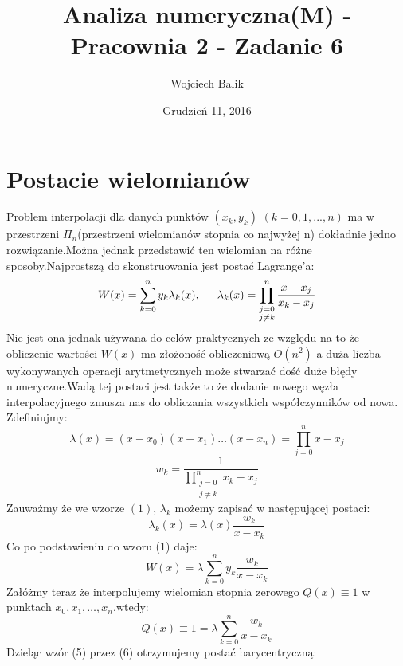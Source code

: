 \documentclass[11pt,wide]{article}
\title{Analiza numeryczna(M) - Pracownia 2 - Zadanie 6\\
}
\date{Grudzień 11, 2016}
\author{Wojciech Balik}
\begin{document}
\maketitle                
\thispagestyle{empty}     
\tableofcontents          
\section{Postacie wielomianów}
Problem interpolacji dla danych punktów $(x_k, y_k)$ $(k = 0,1,...,n)$ ma w przestrzeni $\Pi_n$(przestrzeni wielomianów stopnia co najwyżej n) dokładnie jedno rozwiązanie.Można jednak przedstawić ten wielomian na różne sposoby.Najprostszą do skonstruowania jest postać Lagrange'a:
\begin{equation}
W(x) = \displaystyle\sum_{k = 0}^{n} y_k\lambda_k(x),\indent\lambda_k(x)=\displaystyle\prod_{\substack{j=0\\j \neq k}}^n \frac{x-x_j}{x_k-x_j}
\end{equation}
Nie jest ona jednak używana do celów praktycznych ze względu na to że obliczenie wartości $W(x)$ ma złożoność obliczeniową $O(n^2)$ a duża liczba wykonywanych operacji arytmetycznych może stwarzać dość duże błędy numeryczne.Wadą tej postaci jest także to że dodanie nowego węzła interpolacyjnego zmusza nas do obliczania wszystkich współczynników od nowa.
\newline
Zdefiniujmy:
\begin{equation}
\lambda(x) = (x-x_0)(x-x_1)\ldots(x-x_n) = \displaystyle\prod_{j=0}^n x-x_j
\end{equation}
\begin{equation}
w_k = \frac{1}{\displaystyle\prod_{\substack{j=0\\j \neq k}}^n x_k-x_j}
\end{equation}
Zauważmy że we wzorze $(1)$, $\lambda_k$ możemy zapisać w następującej postaci:
\begin{equation}
\lambda_k(x) = \lambda(x) \frac{w_k}{x-x_k}
\end{equation}
Co po podstawieniu do wzoru (1) daje:
\begin{equation}
W(x) = \lambda\displaystyle\sum_{k=0}^n y_k\frac{w_k}{x-x_k}
\end{equation}
Załóżmy teraz że interpolujemy wielomian stopnia zerowego $Q(x) \equiv 1$ w punktach $x_0,x_1,\ldots,x_n$,wtedy:
\begin{equation}
Q(x) \equiv 1 = \lambda\displaystyle\sum_{k=0}^n \frac{w_k}{x-x_k}
\end{equation}
Dzieląc wzór (5) przez (6) otrzymujemy postać barycentryczną:
\end{document}
